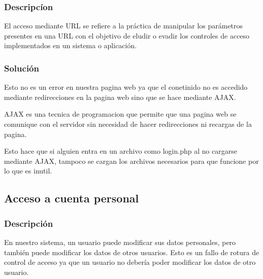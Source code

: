 \documentclass{report}
\begin{document}
                \subsubsection{Descripcíon}
                    El acceso mediante URL se refiere a la práctica de manipular los parámetros presentes en una URL con el objetivo de eludir o evadir los controles de acceso implementados en un sistema o aplicación. 
                \subsubsection{Solución}
                    Esto no es un error en nuestra pagina web ya que el conetinido no es accedido mediante redirecciones en la pagina web sino que se hace mediante AJAX.
                    
                    AJAX es una tecnica de programacion que permite que una pagina web se comunique con el servidor sin necesidad de hacer redirecciones ni recargas de la pagina.
                    
                    Esto hace que si alguien entra en un archivo como login.php al no cargarse mediante AJAX, tampoco se cargan los archivos necesarios para que funcione por lo que es inutil.
                \clearpage
            \subsection{Acceso a cuenta personal}
                \subsubsection{Descripción}
                    En nuestro sistema, un usuario puede modificar sus datos personales, pero también puede modificar los datos de otros usuarios. 
                    Esto es un fallo de rotura de control de acceso ya que un usuario no debería poder modificar los datos de otro usuario.
\end{document}
